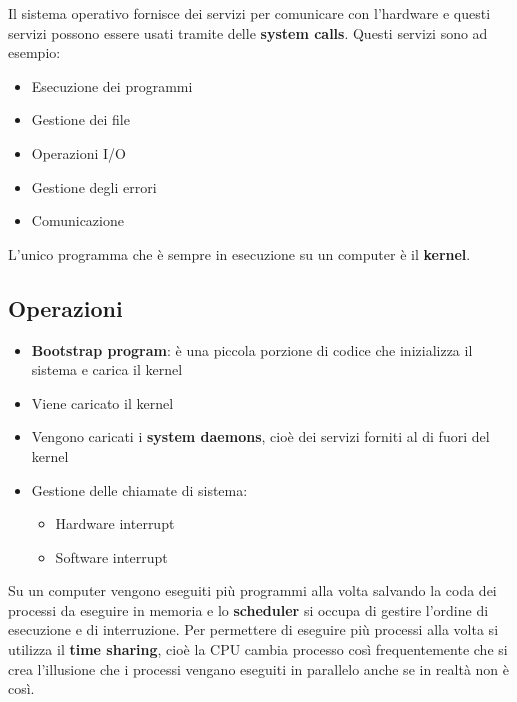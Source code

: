 \documentclass[a4paper]{article}
\theoremstyle{break}
\theoremstyle{break}
\theoremstyle{break}
\theoremstyle{break}
\begin{document}
\noindent
Il sistema operativo fornisce dei servizi per comunicare con l'hardware e questi
servizi possono essere usati tramite delle \textbf{system calls}. Questi servizi
sono ad esempio:

\begin{itemize}
  \item Esecuzione dei programmi
  \item Gestione dei file
  \item Operazioni I/O
  \item Gestione degli errori
  \item Comunicazione
\end{itemize}

\noindent
L'unico programma che è sempre in esecuzione su un computer è il \textbf{kernel}.

\subsection{Operazioni}
\begin{itemize}
  \item \textbf{Bootstrap program}: è una piccola porzione di codice che inizializza
    il sistema e carica il kernel

  \item Viene caricato il kernel

  \item Vengono caricati i \textbf{system daemons}, cioè dei servizi forniti al
    di fuori del kernel

  \item Gestione delle chiamate di sistema:
    \begin{itemize}
      \item Hardware interrupt
      \item Software interrupt
    \end{itemize}
\end{itemize}

\noindent
Su un computer vengono eseguiti più programmi alla volta salvando la coda dei
processi da eseguire in memoria e lo \textbf{scheduler} si occupa di gestire
l'ordine di esecuzione e di interruzione. Per permettere di eseguire più processi
alla volta si utilizza il \textbf{time sharing}, cioè la CPU cambia processo così
frequentemente che si crea l'illusione che i processi vengano eseguiti in parallelo
anche se in realtà non è così.

\section{Modalità di esecuzione}
Il sistema operativo può eseguire il codice in 2 modalità:
\begin{enumerate}
  \item \textbf{Modalità utente}: il codice viene eseguito in modo normale
  \item \textbf{Modalità kernel}: il codice viene eseguito con privilegi speciali
    che permettono di accedere all'hardware
\end{enumerate}
\end{document}
